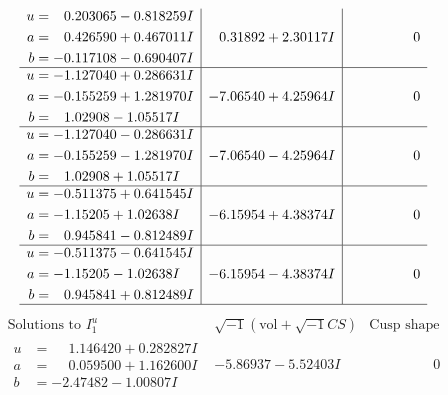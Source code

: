 \documentclass[1p]{elsarticle_modified}
\theoremstyle{definition}
\newcommand{\I}{\sqrt{-1}}
\begin{document}
$$\begin{array}{c|c|c}
\begin{aligned}
u &= \phantom{-}0.203065 - 0.818259 I \\
a &= \phantom{-}0.426590 + 0.467011 I \\
b &= -0.117108 - 0.690407 I\end{aligned}
 & \phantom{-}0.31892 + 2.30117 I & \phantom{-0.000000 } 0 \\ \hline\begin{aligned}
u &= -1.127040 + 0.286631 I \\
a &= -0.155259 + 1.281970 I \\
b &= \phantom{-}1.02908 - 1.05517 I\end{aligned}
 & -7.06540 + 4.25964 I & \phantom{-0.000000 } 0 \\ \hline\begin{aligned}
u &= -1.127040 - 0.286631 I \\
a &= -0.155259 - 1.281970 I \\
b &= \phantom{-}1.02908 + 1.05517 I\end{aligned}
 & -7.06540 - 4.25964 I & \phantom{-0.000000 } 0 \\ \hline\begin{aligned}
u &= -0.511375 + 0.641545 I \\
a &= -1.15205 + 1.02638 I \\
b &= \phantom{-}0.945841 - 0.812489 I\end{aligned}
 & -6.15954 + 4.38374 I & \phantom{-0.000000 } 0 \\ \hline\begin{aligned}
u &= -0.511375 - 0.641545 I \\
a &= -1.15205 - 1.02638 I \\
b &= \phantom{-}0.945841 + 0.812489 I\end{aligned}
 & -6.15954 - 4.38374 I & \phantom{-0.000000 } 0\\
 \hline 
 \end{array}$$\newpage$$\begin{array}{c|c|c}  
\text{Solutions to }I^u_{1}& \I (\text{vol} + \sqrt{-1}CS) & \text{Cusp shape}\\
 \hline 
\begin{aligned}
u &= \phantom{-}1.146420 + 0.282827 I \\
a &= \phantom{-}0.059500 + 1.162600 I \\
b &= -2.47482 - 1.00807 I\end{aligned}
 & -5.86937 - 5.52403 I & \phantom{-0.000000 } 0 \\ \hline\begin{aligned}

\end{aligned}
\end{array}$$
\end{document}

